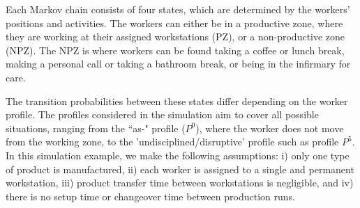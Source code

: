\documentclass[review,12pt, 3p, times]{elsarticle}
\begin{document}
Each Markov chain consists of four states, which are determined by the workers' positions and activities. The workers can either be in a productive zone, where they are working at their assigned workstations (PZ), or a non-productive zone (NPZ). The NPZ is where workers can be found taking a coffee or lunch break, making a personal call or taking a bathroom break, or being in the infirmary for care.
	
The transition probabilities between these states differ depending on the worker profile. The profiles considered in the simulation aim to cover all possible situations, ranging from the “as-" profile ($P^0$), where the worker does not move from the working zone, to the 'undisciplined/disruptive' profile such as profile $P^5$. 
In this simulation example, we make the following assumptions: i) only one type of product is manufactured, ii) each worker is assigned to a single and permanent workstation, iii) product transfer time between workstations is negligible, and iv) there is no setup time or changeover time between production runs.
\end{document}
